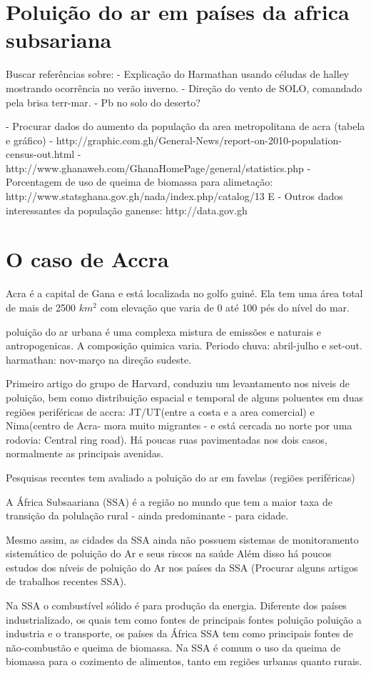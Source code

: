 \section{Poluição do ar em países da africa subsariana}

Buscar referências sobre:
 - Explicação do Harmathan usando céludas de halley mostrando ocorrência no 
   verão inverno.
 - Direção do vento de SOLO, comandado pela brisa terr-mar.
 - Pb no solo do deserto?

- Procurar dados do aumento da população da area metropolitana de acra 
  (tabela e gráfico)
- http://graphic.com.gh/General-News/report-on-2010-population-census-out.html
- http://www.ghanaweb.com/GhanaHomePage/general/statistics.php
- Porcentagem de uso de queima de biomassa para alimetação: 
http://www.statsghana.gov.gh/nada/index.php/catalog/13 E 
- Outros dados interessantes da população ganense: http://data.gov.gh

\section{O caso de Accra}

Acra é a capital  de Gana e está localizada no golfo guiné. Ela tem uma área 
total de mais de 2500 $km^2$ com elevação que varia de 0 até 100 pés do nível do mar. 

poluição do ar urbana é uma complexa mistura de emissões e naturais e antropogenicas. 
A composição quimica varia.  Periodo chuva: abril-julho e set-out. harmathan: nov-março na
direção sudeste.

Primeiro artigo do grupo de Harvard, conduziu um levantamento nos niveis de poluição, 
bem como distribuição espacial e temporal de alguns poluentes em duas regiões periféricas
de accra: JT/UT(entre a costa e a area comercial) e Nima(centro de Acra- mora muito 
migrantes - e está cercada no norte por uma rodovia: Central ring road). Há poucas ruas 
pavimentadas nos dois casos, normalmente as principais avenidas. %

Pesquisas recentes tem avaliado a poluição do ar em favelas (regiões periféricas) 

A África Subsaariana (SSA) é a região no mundo que tem a maior taxa de transição da 
polulação rural - ainda predominante - para cidade. %

Mesmo assim, as cidades da SSA ainda não possuem sistemas de monitoramento sistemático de 
poluição do Ar e seus riscos na saúde %
Além disso há poucos estudos dos níveis de poluição do Ar nos países da SSA 
(Procurar alguns artigos de trabalhos recentes SSA).

Na SSA o combustível sólido é para produção da energia.
Diferente dos países industrializado, os quais tem como fontes de principais fontes 
poluição poluição a industria e o transporte, os países da África SSA tem como principais 
fontes de não-combustão e queima de biomassa. Na SSA é comum o uso da queima de biomassa 
para o cozimento de alimentos, tanto em regiões urbanas quanto rurais. %
